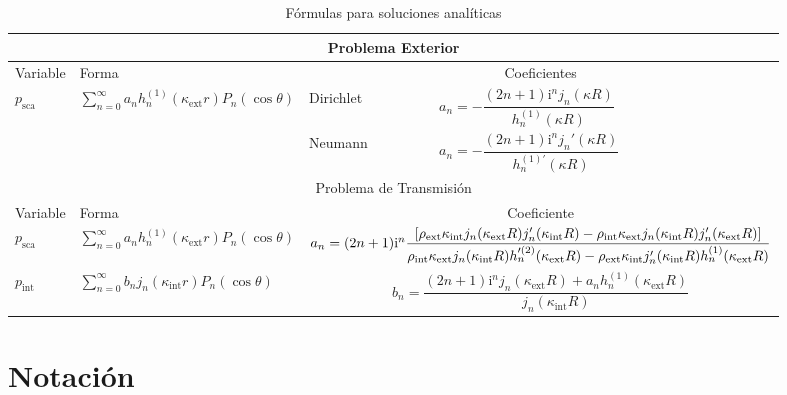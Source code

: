 \documentclass[11pt]{article}
\numberwithin{equation}{section}
\let\i\relax
\def\i{\mathrm{i}}
\def\exterior{\textrm{ext}}
\def\interior{\textrm{int}}
\def\sca{\textrm{sca}}
\begin{document}
\begin{table}[H]
\centering
\begin{tabular}{ |p{1cm}|p{4cm}|p{2cm}|p{4cm}|  }
	\hline
	\multicolumn{4}{|c|}{Problema Exterior} \\
	\hline
	Variable & Forma & \multicolumn{2}{|c|}{Coeficientes} \\
	\hline
	\multirow{2}{2cm}{ \(p_{\sca}\) }
	& 
	\multirow{2}{2cm}{ \(\sum_{n=0}^{\infty} a_n h^{(1)}_{n}(\kappa_{\exterior} r) P_{n}(\cos\theta)\) }
	&
	Dirichlet& \(a_n = -\dfrac{(2n+1)\i^n j_n(\kappa R)}{h^{(1)}_{n}(\kappa R)}\) \\[1em]
	\cline{3-4}
	&&
	Neumann& \( a_n = -\dfrac{(2n+1) \i^n j_n'(\kappa R)}{h^{(1)'}_{n}(\kappa R)}\)
	\\[1em]
	\hline
	\multicolumn{4}{|c|}{Problema de Transmisión} \\
	\hline
	Variable & Forma & \multicolumn{2}{|c|}{Coeficiente} \\
	\hline
	\(p_{\sca}\)
	& 
	\(\sum_{n=0}^{\infty} a_n h^{(1)}_{n}(\kappa_{\exterior} r) P_{n}(\cos\theta)\)
	&
	\multicolumn{2}{|c|}{\(
	a_{n} =
	(2n+1) \i^n
	\dfrac
	{%
		\left[
			\rho_{\exterior} \kappa_{\interior}
			j_n(\kappa_{\exterior} R)
			j'_{n}(\kappa_{\interior} R)
			-
			\rho_{\interior} \kappa_{\exterior}
			j_{n}(\kappa_{\interior} R)
			j'_{n}(\kappa_{\exterior} R)
		\right]
	}
	{%
		\rho_{\interior} \kappa_{\exterior}
		j_{n}(\kappa_{\interior} R)
		h'^{(2)}_{n}(\kappa_{\exterior} R)
		-
		\rho_{\exterior} \kappa_{\interior}
		j'_{n}(\kappa_{\interior} R)
		h^{(1)}_{n}(\kappa_{\exterior} R)
	}\)
	} \\[1em]
	\hline
	\(p_{\interior}\)
	&
	\( \sum_{n=0}^{\infty} b_n j_{n}(\kappa_{\interior} r) P_{n}(\cos\theta) \)
	&
	\multicolumn{2}{|c|}{\(
	b_n =
	\dfrac
	{
		(2n + 1) \i^n j_n(\kappa_{\exterior} R) 
		+ 
		a_{n} h^{(1)}_{n} (\kappa_{\exterior} R)
	}
	{
		j_{n}(\kappa_{\interior} R)
	}
	\)}\\[1em]
	\hline
\end{tabular}
\caption{Fórmulas para soluciones analíticas}
\end{table}

\appendix

\restoregeometry

\section{Notación}\label{ap:notacion}
\end{document}

